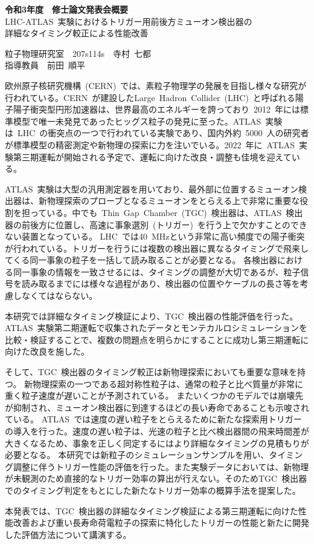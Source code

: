 \begin{center}\vspace*{-2cm}
    \textbf{令和3年度　修士論文発表会概要}\\
    \large{LHC-ATLAS~実験におけるトリガー用前後方ミューオン検出器の}\\
    \large{詳細なタイミング較正による性能改善}
\end{center}
\begin{flushright}
粒子物理研究室　207s114s　寺村~七都\\
指導教員　前田~順平
\end{flushright}
\thispagestyle{empty}
欧州原子核研究機構~(CERN)~では、素粒子物理学の発展を目指し様々な研究が行われている。CERN~が建設したLarge~Hadron~Collider~(LHC)~と呼ばれる陽子陽子衝突型円形加速器は、世界最高のエネルギーを誇っており~2012~年には標準模型で唯一未発見であったヒッグス粒子の発見に至った。ATLAS~実験は~LHC~の衝突点の一つで行われている実験であり、国内外約~5000~人の研究者が標準模型の精密測定や新物理の探索に力を注いでいる。2022~年に~ATLAS~実験第三期運転が開始される予定で、運転に向けた改良・調整も佳境を迎えている。

ATLAS~実験は大型の汎用測定器を用いており、最外部に位置するミューオン検出器は、新物理探索のプローブとなるミューオンをとらえる上で非常に重要な役割を担っている。中でも~Thin~Gap~Chamber~(TGC)~検出器は、ATLAS~検出器の前後方に位置し、高速に事象選別~(トリガー)~を行う上で欠かすことのできない装置となっている。
LHC~では40~MHzという非常に高い頻度での陽子衝突が行われている。トリガーを行うには複数の検出器に異なるタイミングで飛来してくる同一事象の粒子を一括して読み取ることが必要となる。
各検出器における同一事象の情報を一致させるには、タイミングの調整が大切であるが、粒子信号を読み取るまでには様々な過程があり、検出器の位置やケーブルの長さ等を考慮しなくてはならない。

本研究では詳細なタイミング検証により、TGC~検出器の性能評価を行った。ATLAS~実験第二期運転で収集されたデータとモンテカルロシミュレーションを比較・検証することで、複数の問題点を明らかにすることに成功し第三期運転に向けた改良を施した。

そして、TGC~検出器のタイミング較正は新物理探索においても重要な意味を持つ。
新物理探索の一つである超対称性粒子は、通常の粒子と比べ質量が非常に重く粒子速度が遅いことが予測されている。
またいくつかのモデルでは崩壊先が抑制され、ミューオン検出器に到達するほどの長い寿命であることも示唆されている。
ATLAS~では速度の遅い粒子をとらえるために新たな探索用トリガーの導入を行った。速度の遅い粒子は、光速の粒子と比べ検出器間の飛来時間差が大きくなるため、事象を正しく同定するにはより詳細なタイミングの見積もりが必要となる。
本研究では新粒子のシミュレーションサンプルを用い、タイミング調整に伴うトリガー性能の評価を行った。また実験データにおいては、新物理が未観測のため直接的なトリガー効率の算出が行えない。そのためTGC~検出器でのタイミング判定をもとにした新たなトリガー効率の概算手法を提案した。

本発表では、TGC~検出器の詳細なタイミング検証による第三期運転に向けた性能改善および重い長寿命荷電粒子の探索に特化したトリガーの性能と新たに開発した評価方法について講演する。